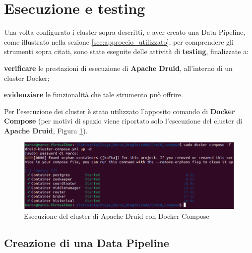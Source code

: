 \section{Esecuzione e testing}
Una volta configurato i \gls{cluster}{} sopra descritti, e aver creato una \gls{Data Pipeline}{}, come illustrato nella sezione \ref{sec:approccio_utilizzato}, 
per comprendere gli strumenti sopra citati, sono state eseguite delle attività di \textbf{testing}, finalizzate a:
\begin{list}{*}
    \item \textbf{verificare} le prestazioni di esecuzione di \textbf{Apache Druid}, all'interno di un \gls{cluster}{} \gls{Docker}{};
   \item  \item \textbf{evidenziare} le funzionalità che tale strumento può offrire.
\end{list}
\noindent
Per l'esecuzione dei \gls{cluster}{} è stato utilizzato l'apposito comando di \textbf{Docker Compose} (per motivi di spazio viene riportato solo 
l'esecuzione del \gls{cluster}{} di \textbf{Apache Druid}, Figura \ref{fig:druid_compose}).
\begin{figure}[h]
  \centering
  \includegraphics[width=1\textwidth]{images/percorso/druid_cluster.png}
  \caption{Esecuzione del cluster di Apache Druid con Docker Compose}
  \label{fig:druid_compose}
\end{figure}
\subsection{Creazione di una Data Pipeline}
